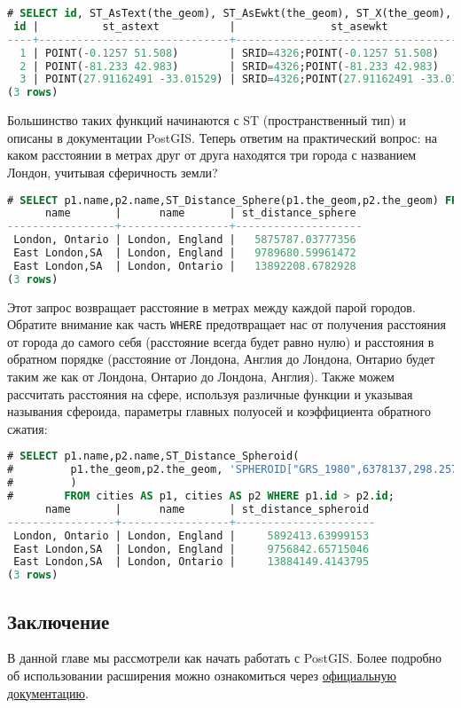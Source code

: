 \begin{lstlisting}[language=SQL,label=lst:postgisselectcities2,caption=SELECT cities]
# SELECT id, ST_AsText(the_geom), ST_AsEwkt(the_geom), ST_X(the_geom), ST_Y(the_geom) FROM cities;
 id |          st_astext           |               st_asewkt                |    st_x     |   st_y
----+------------------------------+----------------------------------------+-------------+-----------
  1 | POINT(-0.1257 51.508)        | SRID=4326;POINT(-0.1257 51.508)        |     -0.1257 |    51.508
  2 | POINT(-81.233 42.983)        | SRID=4326;POINT(-81.233 42.983)        |     -81.233 |    42.983
  3 | POINT(27.91162491 -33.01529) | SRID=4326;POINT(27.91162491 -33.01529) | 27.91162491 | -33.01529
(3 rows)
\end{lstlisting}

Большинство таких функций начинаются с ST (пространственный тип) и описаны в документации PostGIS. Теперь ответим на практический вопрос: на каком расстоянии в метрах друг от друга находятся три города с названием Лондон, учитывая сферичность земли?

\begin{lstlisting}[language=SQL,label=lst:postgisselectcities3,caption=Расстояние до Лондона]
# SELECT p1.name,p2.name,ST_Distance_Sphere(p1.the_geom,p2.the_geom) FROM cities AS p1, cities AS p2 WHERE p1.id > p2.id;
      name       |      name       | st_distance_sphere
-----------------+-----------------+--------------------
 London, Ontario | London, England |   5875787.03777356
 East London,SA  | London, England |   9789680.59961472
 East London,SA  | London, Ontario |   13892208.6782928
(3 rows)
\end{lstlisting}

Этот запрос возвращает расстояние в метрах между каждой парой городов. Обратите внимание как часть \lstinline!WHERE! предотвращает нас от получения расстояния от города до самого себя (расстояние всегда будет равно нулю) и расстояния в обратном порядке (расстояние от Лондона, Англия до Лондона, Онтарио будет таким же как от Лондона, Онтарио до Лондона, Англия). Также можем рассчитать расстояния на сфере, используя различные функции и указывая называния сфероида, параметры главных полуосей и коэффициента обратного сжатия:

\begin{lstlisting}[language=SQL,label=lst:postgisselectcities4,caption=Расстояние до Лондона]
# SELECT p1.name,p2.name,ST_Distance_Spheroid(
#         p1.the_geom,p2.the_geom, 'SPHEROID["GRS_1980",6378137,298.257222]'
#         )
#        FROM cities AS p1, cities AS p2 WHERE p1.id > p2.id;
      name       |      name       | st_distance_spheroid
-----------------+-----------------+----------------------
 London, Ontario | London, England |     5892413.63999153
 East London,SA  | London, England |     9756842.65715046
 East London,SA  | London, Ontario |     13884149.4143795
(3 rows)
\end{lstlisting}


\subsection{Заключение}

В данной главе мы рассмотрели как начать работать с PostGIS. Более подробно об использовании расширения можно ознакомиться через \href{http://postgis.net/documentation/}{официальную документацию}.
